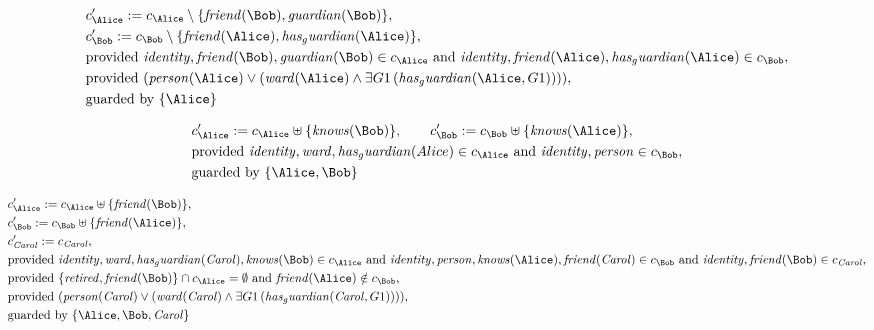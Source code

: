 \begin{align*}
&
c'_
{
\Alice
}
 := 
c_
{
\Alice
}
 \setminus 
\{
\mathit{
friend
}
(
\Bob
)
,
\mathit{
guardian
}
(
\Bob
)
\}
,\\
&
c'_
{
\Bob
}
 := 
c_
{
\Bob
}
 \setminus 
\{
\mathit{
friend
}
(
\Alice
)
,
\mathit{
has_guardian
}
(
\Alice
)
\}
,\\
&
\text{provided } 
\mathit{
identity
}
,
\mathit{
friend
}
(
\Bob
)
,
\mathit{
guardian
}
(
\Bob
)
 \in c_
{
\Alice
}
 \text{ and } 
\mathit{
identity
}
,
\mathit{
friend
}
(
\Alice
)
,
\mathit{
has_guardian
}
(
\Alice
)
 \in c_
{
\Bob
}
,\\
&
\text{provided } 
(
\mathit{
person
}
(
\Alice
)
\lor
(
\mathit{
ward
}
(
\Alice
)
\land
\exists 
G1
\,(
\mathit{
has_guardian
}
(
\Alice
,
G1
)
)
)
)
,\\
&
\text{guarded by } \{
\Alice
\}
\end{align*}

\begin{align*}
&
c'_
{
\Alice
}
 := 
c_
{
\Alice
}
 \uplus 
\{
\mathit{
knows
}
(
\Bob
)
\}
, \qquad 
c'_
{
\Bob
}
 := 
c_
{
\Bob
}
 \uplus 
\{
\mathit{
knows
}
(
\Alice
)
\}
,\\
&
\text{provided } 
\mathit{
identity
}
,
\mathit{
ward
}
,
\mathit{
has_guardian
}
(
Alice
)
 \in c_
{
\Alice
}
 \text{ and } 
\mathit{
identity
}
,
\mathit{
person
}
 \in c_
{
\Bob
}
,\\
&
\text{guarded by } \{
\Alice
,
\Bob
\}
\end{align*}

\begin{align*}
&
c'_
{
\Alice
}
 := 
c_
{
\Alice
}
 \uplus 
\{
\mathit{
friend
}
(
\Bob
)
\}
,\\
&
c'_
{
\Bob
}
 := 
c_
{
\Bob
}
 \uplus 
\{
\mathit{
friend
}
(
\Alice
)
\}
,\\
&
c'_
{
\mathit{Carol}
}
 := 
c_
{
\mathit{Carol}
}
,\\
&
\text{provided } 
\mathit{
identity
}
,
\mathit{
ward
}
,
\mathit{
has_guardian
}
(
\mathit{Carol}
)
,
\mathit{
knows
}
(
\Bob
)
 \in c_
{
\Alice
}
 \text{ and } 
\mathit{
identity
}
,
\mathit{
person
}
,
\mathit{
knows
}
(
\Alice
)
,
\mathit{
friend
}
(
\mathit{Carol}
)
 \in c_
{
\Bob
}
 \text{ and } 
\mathit{
identity
}
,
\mathit{
friend
}
(
\Bob
)
 \in c_
{
\mathit{Carol}
}
,\\
&
\text{provided } 
\{
\mathit{
retired
}
,
\mathit{
friend
}
(
\Bob
)
\}
 \cap c_
{
\Alice
}
 = \emptyset
 \text{ and } 
\mathit{
friend
}
(
\Alice
)
 \notin c_
{
\Bob
}
,\\
&
\text{provided } 
(
\mathit{
person
}
(
\mathit{Carol}
)
\lor
(
\mathit{
ward
}
(
\mathit{Carol}
)
\land
\exists 
G1
\,(
\mathit{
has_guardian
}
(
\mathit{Carol}
,
G1
)
)
)
)
,\\
&
\text{guarded by } \{
\Alice
,
\Bob
,
\mathit{Carol}
\}
\end{align*}
